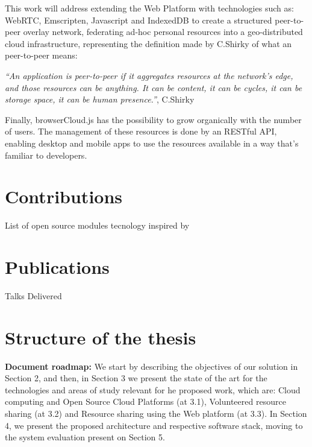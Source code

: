 This work will address extending the Web Platform with technologies such as: WebRTC, Emscripten, Javascript and IndexedDB to create a structured peer-to-peer overlay network, federating ad-hoc personal resources into a geo-distributed cloud infrastructure, representing the definition made by C.Shirky of what an peer-to-peer means:

  \textit{``An application is peer-to-peer if it aggregates resources at the network’s edge, and those resources can be anything. It can be content, it can be cycles, it can be storage space, it can be human presence.''}, C.Shirky \cite{Shirky.}

Finally, browserCloud.js has the possibility to grow organically with the number of users. The management of these resources is done by an RESTful API, enabling desktop and mobile apps to use the resources available in a way that's familiar to developers. 

\section{Contributions}

List of open source modules
tecnology inspired by

\section{Publications}

Talks Delivered 

\section{Structure of the thesis}

\textbf{Document roadmap:} We start by describing the objectives of our solution in Section 2, and then, in Section 3 we present the state of the art for the technologies and areas of study relevant for he proposed work, which are: Cloud computing and Open Source Cloud Platforms (at 3.1), Volunteered resource sharing (at 3.2) and Resource sharing using the Web platform (at 3.3). In Section 4, we present the proposed architecture and respective software stack, moving to the system evaluation present on Section 5.


